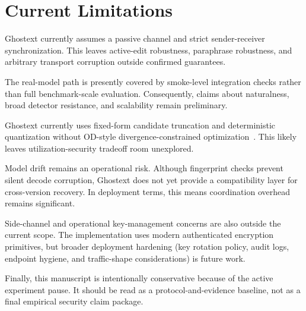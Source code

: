 \section{Current Limitations}

Ghostext currently assumes a passive channel and strict sender-receiver synchronization. This leaves active-edit robustness, paraphrase robustness, and arbitrary transport corruption outside confirmed guarantees.

The real-model path is presently covered by smoke-level integration checks rather than full benchmark-scale evaluation. Consequently, claims about naturalness, broad detector resistance, and scalability remain preliminary.

Ghostext currently uses fixed-form candidate truncation and deterministic quantization without OD-style divergence-constrained optimization~\cite{huang2026odstega}. This likely leaves utilization-security tradeoff room unexplored.

Model drift remains an operational risk. Although fingerprint checks prevent silent decode corruption, Ghostext does not yet provide a compatibility layer for cross-version recovery. In deployment terms, this means coordination overhead remains significant.

Side-channel and operational key-management concerns are also outside the current scope. The implementation uses modern authenticated encryption primitives, but broader deployment hardening (key rotation policy, audit logs, endpoint hygiene, and traffic-shape considerations) is future work.

Finally, this manuscript is intentionally conservative because of the active experiment pause. It should be read as a protocol-and-evidence baseline, not as a final empirical security claim package.
